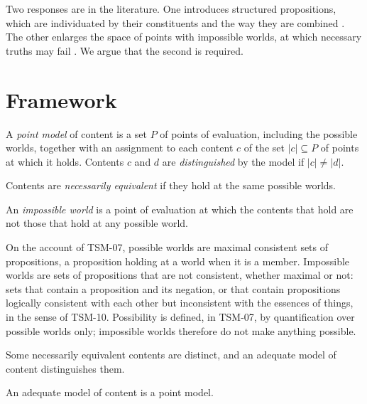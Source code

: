 \documentclass{situationist-preprint}
\begin{document}
Two responses are in the literature. One introduces structured propositions, which are individuated by their constituents and the way they are combined \citep{Soames1987}. The other enlarges the space of points with impossible worlds, at which necessary truths may fail \citep{Nolan1997,Jago2014,BertoJago2019}. We argue that the second is required.

\section{Framework}

\begin{definition}\label{d:model}
A \emph{point model} of content is a set $P$ of points of evaluation, including the possible worlds, together with an assignment to each content $c$ of the set $|c|\subseteq P$ of points at which it holds. Contents $c$ and $d$ are \emph{distinguished} by the model if $|c|\ne|d|$.
\end{definition}

\begin{definition}\label{d:equiv}
Contents are \emph{necessarily equivalent} if they hold at the same possible worlds.
\end{definition}

\begin{definition}\label{d:imp}
An \emph{impossible world} is a point of evaluation at which the contents that hold are not those that hold at any possible world.
\end{definition}

On the account of TSM-07, possible worlds are maximal consistent sets of propositions, a proposition holding at a world when it is a member. Impossible worlds are sets of propositions that are not consistent, whether maximal or not: sets that contain a proposition and its negation, or that contain propositions logically consistent with each other but inconsistent with the essences of things, in the sense of TSM-10. Possibility is defined, in TSM-07, by quantification over possible worlds only; impossible worlds therefore do not make anything possible.

\begin{principle}[Hyperintensionality]\label{p:hyper}
Some necessarily equivalent contents are distinct, and an adequate model of content distinguishes them.
\end{principle}

\begin{principle}\label{p:format}
An adequate model of content is a point model.
\end{principle}
\end{document}
